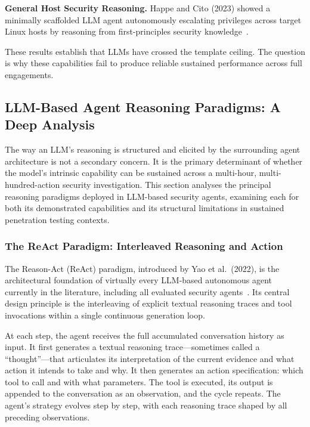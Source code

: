 \documentclass[12pt,a4paper,oneside,openany]{book}
\begin{document}
\textbf{General Host Security Reasoning.} Happe and Cito (2023) showed a minimally scaffolded LLM agent autonomously escalating privileges across target Linux hosts by reasoning from first-principles security knowledge~\citep{happe2023hackerllm}.

These results establish that LLMs have crossed the template ceiling. The question is why these capabilities fail to produce reliable sustained performance across full engagements.


\subsection{LLM-Based Agent Reasoning Paradigms: A Deep Analysis}
\label{subsec:paradigms}

The way an LLM's reasoning is structured and elicited by the surrounding agent architecture is not a secondary concern. It is the primary determinant of whether the model's intrinsic capability can be sustained across a multi-hour, multi-hundred-action security investigation. This section analyses the principal reasoning paradigms deployed in LLM-based security agents, examining each for both its demonstrated capabilities and its structural limitations in sustained penetration testing contexts.

\subsubsection{The ReAct Paradigm: Interleaved Reasoning and Action}
\label{subsubsec:react}

The Reason-Act (ReAct) paradigm, introduced by Yao et al.\ (2022), is the architectural foundation of virtually every LLM-based autonomous agent currently in the literature, including all evaluated security agents~\citep{yao2022react}. Its central design principle is the interleaving of explicit textual reasoning traces and tool invocations within a single continuous generation loop.

At each step, the agent receives the full accumulated conversation history as input. It first generates a textual reasoning trace---sometimes called a ``thought''---that articulates its interpretation of the current evidence and what action it intends to take and why. It then generates an action specification: which tool to call and with what parameters. The tool is executed, its output is appended to the conversation as an observation, and the cycle repeats. The agent's strategy evolves step by step, with each reasoning trace shaped by all preceding observations.
\end{document}
